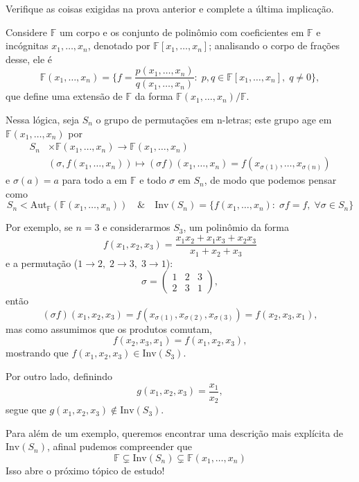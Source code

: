\documentclass[../algebraIII_notes.tex]{subfiles}
\begin{document}
\begin{exr}
	Verifique as coisas exigidas na prova anterior e complete a última implicação.
\end{exr}
\begin{example}
	Considere \(\mathbb{F}\) um corpo e os conjunto de polinômio com coeficientes em \(\mathbb{F}\) e incógnitas \(x_1, \dotsc , x_{n}\), denotado por \(\mathbb{F}[x_1, \dotsc , x_{n}]\); analisando o corpo de frações desse, ele é
	\[
		\mathbb{F}(x_1, \dotsc , x_{n}) = \biggl\{f=\frac{p(x_1, \dotsc , x_{n})}{q(x_1, \dotsc , x_{n})}:\; p, q\in \mathbb{F}[x_1, \dotsc , x_{n}],\; q\neq 0\biggr\},
	\]
	que define uma extensão de \(\mathbb{F}\) da forma \(\mathbb{F}(x_1, \dotsc , x_{n})/\mathbb{F}\).

	Nessa lógica, seja \(S_{n}\) o grupo de permutações em n-letras; este grupo age em \(\mathbb{F}(x_1, \dotsc , x_{n})\) por
	\begin{align*}
		S_{n} & \times \mathbb{F}(x_1, \dotsc , x_{n})\rightarrow \mathbb{F}(x_1, \dotsc , x_{n})                                    \\
		      & (\sigma , f(x_1, \dotsc , x_{n}))\mapsto (\sigma f)(x_1, \dotsc , x_{n}) = f(x_{\sigma(1)}, \dotsc , x_{\sigma (n)})
	\end{align*}
	e \(\sigma (a) = a\) para todo a em \(\mathbb{F}\) e todo \(\sigma \) em \(S_{n}\), de modo que podemos pensar como
	\[
		S_{n}<\mathrm{Aut}_{\mathbb{F}}(\mathbb{F}(x_1, \dotsc , x_{n})) \quad\&\quad \mathrm{Inv}(S_{n}) = \{f(x_1, \dotsc , x_{n}):\; \sigma f = f,\; \forall \sigma \in S_{n}\}
	\]

	Por exemplo, se \(n=3\) e considerarmos \(S_{3}\), um polinômio da forma
	\[
		f(x_1, x_2, x_3) = \frac{x_1x_2+x_1x_3+x_2x_3}{x_1+x_2+x_3}
	\]
	e a permutação (\(1\rightarrow 2,\; 2\rightarrow 3,\; 3\rightarrow 1\)):
	\[
		\sigma  = \begin{pmatrix}
			1 & 2 & 3 \\
			2 & 3 & 1
		\end{pmatrix},
	\]
	então
	\[
		(\sigma f)(x_1, x_2, x_3) = f(x_{\sigma (1)}, x_{\sigma (2)}, x_{\sigma (3)})=f(x_2, x_3, x_1),
	\]
	mas como assumimos que os produtos comutam,
	\[
		f(x_2, x_3, x_1) = f(x_1, x_2, x_3),
	\]
	mostrando que \(f(x_1, x_2, x_3)\in \mathrm{Inv}(S_3)\).

	Por outro lado, definindo
	\[
		g(x_1, x_2, x_3) = \frac{x_1}{x_2},
	\]
	segue que \(g(x_1, x_2, x_3)\not\in \mathrm{Inv}(S_{3})\).
\end{example}
Para além de um exemplo, queremos encontrar uma descrição mais explícita de \(\mathrm{Inv}(S_{n})\), afinal pudemos compreender que
\[
	\mathbb{F}\subsetneq \mathrm{Inv}(S_{n})\subsetneq \mathbb{F}(x_1, \dotsc , x_{n})
\]
Isso abre o próximo tópico de estudo!
\end{document}
